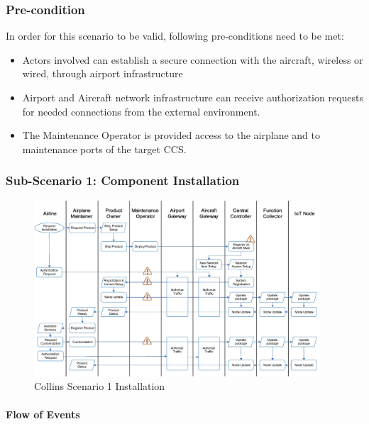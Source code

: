 \subsubsection{Pre-condition}

In order for this scenario to be valid, following pre-conditions need to be met:
\begin{itemize}
	\item Actors involved can establish a secure connection with the aircraft, wireless or wired, through airport
	      infrastructure
	\item Airport and Aircraft network infrastructure can receive authorization requests for needed connections from
	      the external environment.
	\item The Maintenance Operator is provided access to the airplane and to maintenance ports of the target CCS.

\end{itemize}

\subsubsection{Sub-Scenario 1: Component Installation}

\begin{figure}
	\begin{center}
		\includegraphics[width=0.95\textwidth]{figures/collins-s1-installation.jpg}
	\end{center}
	\caption{Collins Scenario 1 Installation}
	\label{fig:collins-s1-installation}
\end{figure}

\paragraph{Flow of Events}


